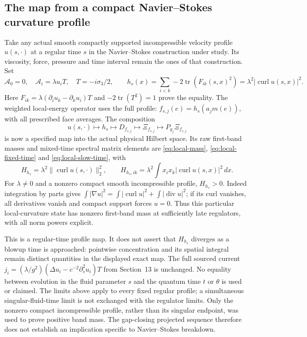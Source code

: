 \subsection{The map from a compact Navier--Stokes curvature profile}

Take any actual smooth compactly supported incompressible velocity
profile $u(s,\cdot)$ at a regular time $s$ in the Navier--Stokes
construction under study. Its viscosity, force, pressure and time
interval remain the ones of that construction. Set
\[
 \mathcal A_0=0,\quad\mathcal A_i=\lambda u_iT,\quad
 T=-i\sigma_3/2,\qquad
 h_s(x)=\sum_{i<k}-2\operatorname{tr}(F_{ik}(s,x)^2)
                =\lambda^2|\operatorname{curl}u(s,x)|^2.
\]
Here $F_{ik}=\lambda(\partial_iu_k-\partial_ku_i)T$ and
$-2\operatorname{tr}(T^2)=1$ prove the equality.
The weighted local-energy operator uses the full profile:
$f_{s,j}(e)=h_s(a_jm(e))$, with all prescribed face averages.
The composition
\[
 u(s,\cdot)\longmapsto h_s\longmapsto D_{f_{s,j}}
 \longmapsto\Xi_{f_{s,j}}\longmapsto P_{g_j}\Xi_{f_{s,j}}
\]
is now a specified map into the actual physical Hilbert space.
Its raw first-band masses and mixed-time spectral matrix elements
are \eqref{eq:local-mass}, \eqref{eq:local-fixed-time} and
\eqref{eq:local-slow-time}, with
\[
 H_{h_s}=\lambda^2\|\operatorname{curl}u(s,\cdot)\|_2^2,
 \qquad
 H_{h_s,ik}=\lambda^2\int x_ix_k|\operatorname{curl}u(s,x)|^2\,dx.
\]
For $\lambda\ne0$ and a nonzero compact smooth incompressible profile,
$H_{h_s}>0$. Indeed integration by parts gives
$\int|\nabla u|^2=\int|\operatorname{curl}u|^2+
\int|\operatorname{div}u|^2$; if its curl vanishes, all derivatives
vanish and compact support forces $u=0$.
Thus this particular local-curvature state has nonzero first-band
mass at sufficiently late regulators, with all norm powers explicit.

This is a regular-time profile map. It does not assert that
$H_{h_s}$ diverges as a blowup time is approached: pointwise
concentration and its spatial integral remain distinct quantities
in the displayed exact map. The full sourced current
$j_i=(\lambda/g^2)(\Delta u_i-c^{-2}\partial_s^2u_i)T$
from Section~13 is unchanged. No equality between evolution in
the fluid parameter $s$ and the quantum time $t$ or $\theta$ is
used or claimed. The limits above apply to every fixed regular
profile; a simultaneous singular-fluid-time limit is not exchanged
with the regulator limits.
Only the nonzero compact incompressible profile, rather than its
singular endpoint, was used to prove positive band mass. The
gap-closing projected sequence therefore does not establish an
implication specific to Navier--Stokes breakdown.

